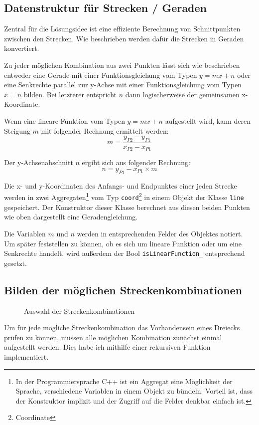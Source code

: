 \subsection {Datenstruktur für Strecken / Geraden}
Zentral für die Lösungsidee ist eine effiziente Berechnung von Schnittpunkten
zwischen den Strecken.
Wie beschrieben werden dafür die Strecken in Geraden konvertiert.

Zu jeder möglichen Kombination aus zwei Punkten lässt sich wie beschrieben
entweder eine Gerade mit einer Funktionsgleichung vom Typen \(y=mx+n\) oder
eine Senkrechte parallel zur y-Achse mit einer Funktionsgleichung vom Typen \(x=n\)
bilden.
Bei letzterer entspricht  \(n\) dann logischerweise der gemeinsamen x-Koordinate.

Wenn eine lineare Funktion vom Typen \(y=mx+n\) aufgestellt wird,
kann deren Steigung \(m\) mit folgender Rechnung ermittelt werden:
\begin{equation}
    m=\frac{y_{P2} - y_{P1}}{x_{P2} - x_{P1}}
\end{equation}

Der y-Achsenabschnitt \(n\) ergibt sich aus folgender Rechnung:
\begin{equation}
    n=y_{P1} - x_{P1} \times m
\end{equation}

Die x- und y-Koordinaten des Anfangs- und Endpunktes einer jeden Strecke werden
in zwei Aggregaten\footnote{In der Programmiersprache C++ ist ein Aggregat eine
Möglichkeit der Sprache, verschiedene Variablen in einem Objekt zu bündeln.
Vorteil ist, dass der Konstruktor implizit und der Zugriff auf die Felder denkbar
einfach ist.} 
vom Typ \texttt{coord}\footnote{Coordinate} in einem Objekt der Klasse \texttt{line}
gespeichert.
Der Konstruktor dieser Klasse berechnet aus diesen beiden Punkten
wie oben dargestellt eine Geradengleichung.

Die Variablen \(m\) und \(n\) werden in entsprechenden Felder des Objektes notiert.
Um später feststellen zu können, ob es sich um lineare Funktion oder um eine Senkrechte 
handelt, wird außerdem der Bool \texttt{isLinearFunction\_} entsprechend gesetzt.

\subsection {Bilden der möglichen Streckenkombinationen}
\begin{wrapfigure}{r}{0.5\textwidth}
    
    \caption{Auswahl der Streckenkombinationen}
    \label{abb:streckrek}
\end{wrapfigure}
Um für jede mögliche Streckenkombination das Vorhandensein eines Dreiecks prüfen zu können, müssen alle möglichen Kombination zunächst einmal aufgestellt werden. Dies habe ich mithilfe einer rekursiven Funktion implementiert.

